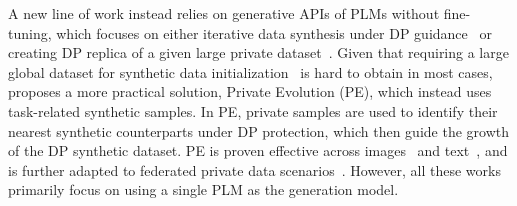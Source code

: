 A new line of work instead relies on generative APIs of PLMs without fine-tuning, which focuses on either iterative data synthesis under DP guidance~\cite{lin2024differentially,zhao2024generate,bojkovic2024differentially} or creating DP replica of a given large private dataset~\cite{nagesh2024private}. %
Given that requiring a large global dataset for synthetic data initialization~\cite{zhao2024generate} is hard to obtain in most cases, \citet{lin2024differentially} proposes a more practical solution, Private Evolution (PE), which instead uses task-related synthetic samples. In PE, private samples are used to identify their nearest synthetic counterparts under DP protection, which then guide the growth of the DP synthetic dataset. PE is proven effective across images~\cite{lin2024differentially} and text~\cite{xie2024differentially}, and is further adapted to federated private data scenarios~\cite{hou2024pretext}.
However, all these works primarily focus on using a single PLM as the generation model.

